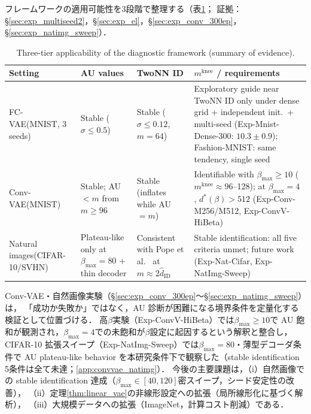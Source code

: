 \documentclass[11pt,a4paper]{jsarticle}
\newcommand{\mknee}{m^{\mathrm{knee}}}
\begin{document}
フレームワークの適用可能性を3段階で整理する（表\ref{tab:applicability}；
証拠：§\ref{sec:exp_multiseed2}，§\ref{sec:exp_el}，§\ref{sec:exp_conv_300ep}，§\ref{sec:exp_natimg_sweep}）．

\begin{table}[H]
\centering
\caption{Three-tier applicability of the diagnostic framework (summary of evidence).}
\label{tab:applicability}
\small
\begin{tabular}{p{2.7cm}p{3.1cm}p{3.3cm}p{5.1cm}}
\toprule
Setting & AU values & TwoNN ID & $\mknee$ / requirements \\
\midrule
FC-VAE\newline (MNIST, 3 seeds) & Stable ($\sigma \leq 0.5$) & Stable ($\sigma \leq 0.12$, $m=64$) &
Exploratory guide near TwoNN ID only under dense grid + independent init.\ + multi-seed
(Exp-Mnist-Dense-300: $10.3 \pm 0.9$); Fashion-MNIST: same tendency, single seed \\
\addlinespace
Conv-VAE\newline (MNIST) & Stable; AU$<m$ from $m \geq 96$ & Stable (inflates while AU$=m$) &
Identifiable with $\beta_{\max} \geq 10$ ($\mknee \approx 96$--128); at $\beta_{\max}=4$, $d^*(\beta) > 512$
(Exp-Conv-M256/M512, Exp-ConvV-HiBeta) \\
\addlinespace
Natural images\newline (CIFAR-10/SVHN) & Plateau-like only at $\beta_{\max}=80$ + thin decoder & Consistent with Pope et al.\ \cite{pope2021intrinsic} at $m \approx 2\hat{d}_\mathrm{ID}$ &
Stable identification: all five criteria unmet; future work
(Exp-Nat-Cifar, Exp-NatImg-Sweep) \\
\bottomrule
\end{tabular}
\end{table}

Conv-VAE・自然画像実験（§\ref{sec:exp_conv_300ep}〜§\ref{sec:exp_natimg_sweep}）は，
「成功か失敗か」ではなく，AU 診断が困難になる境界条件を定量化する検証として位置づける．
高$\beta$実験（Exp-ConvV-HiBeta）では$\beta_{\max} \geq 10$で AU 飽和が観測され，$\beta_{\max}=4$での未飽和が$\beta$設定に起因するという解釈と整合し，
CIFAR-10 拡張スイープ（Exp-NatImg-Sweep）では$\beta_{\max}=80$・薄型デコーダ条件で
AU plateau-like behavior を本研究条件下で観察した（stable identification 5条件は全て未達；\ref{app:convvae_natimg}）．
今後の主要課題は，（i）自然画像での stable identification 達成（$\beta_{\max} \in [40,120]$密スイープ，シード安定性の改善），
（ii）定理\ref{thm:linear_vae}の非線形設定への拡張（局所線形化に基づく解析），
（iii）大規模データへの拡張（ImageNet，計算コスト削減）である．
\end{document}
